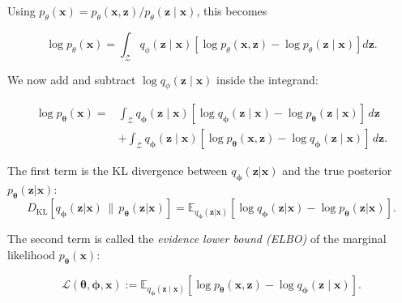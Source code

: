 \documentclass[10pt,twocolumn,article]{memoir}
\begin{document}
Using
$p_\theta(\mathbf{x})
=
p_\theta(\mathbf{x},\mathbf{z})/
p_\theta(\mathbf{z}\mid\mathbf{x})$,
this becomes

\begin{equation}
\log p_\theta(\mathbf{x})
=
\int_{\mathcal{Z}}
q_\phi(\mathbf{z}\mid\mathbf{x})
\left[
\log p_\theta(\mathbf{x},\mathbf{z})
-
\log p_\theta(\mathbf{z}\mid\mathbf{x})
\right]
d\mathbf{z}.
\end{equation}

We now add and subtract
$\log q_\phi(\mathbf{z}\mid\mathbf{x})$ inside the integrand:

\begin{equation}
\begin{aligned}
\log p_{\boldsymbol{\theta}}(\mathbf{x})
={}&
\int_{\mathcal{Z}}
q_{\boldsymbol{\phi}}(\mathbf{z}\mid\mathbf{x})
\left[
\log q_{\boldsymbol{\phi}}(\mathbf{z}\mid\mathbf{x})
-
\log p_{\boldsymbol{\theta}}(\mathbf{z}\mid\mathbf{x})
\right]
\,d\mathbf{z}
\\
&+
\int_{\mathcal{Z}}
q_{\boldsymbol{\phi}}(\mathbf{z}\mid\mathbf{x})
\left[
\log p_{\boldsymbol{\theta}}(\mathbf{x},\mathbf{z})
-
\log q_{\boldsymbol{\phi}}(\mathbf{z}\mid\mathbf{x})
\right]
\,d\mathbf{z}.
\end{aligned}
\end{equation}

The first term is the KL divergence between $q_{\boldsymbol{\phi}}(\mathbf{z} | \mathbf{x})$ and the true posterior $p_{\boldsymbol{\theta}}(\mathbf{z} | \mathbf{x})$:
\begin{equation}
    D_{\mathrm{KL}} \left[ q_{\boldsymbol{\phi}}(\mathbf{z} | \mathbf{x}) \,\|\, p_{\boldsymbol{\theta}}(\mathbf{z} | \mathbf{x}) \right]
    = \mathbb{E}_{q_{\boldsymbol{\phi}}(\mathbf{z} | \mathbf{x})} \left[ \log q_{\boldsymbol{\phi}}(\mathbf{z} | \mathbf{x}) - \log p_{\boldsymbol{\theta}}(\mathbf{z} | \mathbf{x}) \right].
\end{equation}

The second term is called the \textit{evidence lower bound (ELBO)} of the marginal likelihood $p_{\boldsymbol{\theta}}(\mathbf{x})$:

\begin{equation}
    \mathcal{L}(\boldsymbol{\theta}, \boldsymbol{\phi}, \mathbf{x}) := \mathbb{E}_{q_{\boldsymbol{\phi}}(\mathbf{z} \mid \mathbf{x})}
    \left[ \log p_{\boldsymbol{\theta}}(\mathbf{x}, \mathbf{z}) - \log q_{\boldsymbol{\phi}}(\mathbf{z} \mid \mathbf{x}) \right].
\end{equation}
\end{document}
